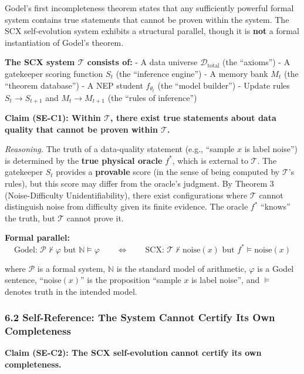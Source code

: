 \documentclass[
  12pt,
]{ctexart}
\begin{document}
Godel's first incompleteness theorem states that any sufficiently
powerful formal system contains true statements that cannot be proven
within the system. The SCX self-evolution system exhibits a structural
parallel, though it is \textbf{not} a formal instantiation of Godel's
theorem.

\textbf{The SCX system \(\mathcal{T}\) consists of:} - A data universe
\(\mathcal{D}_{\text{total}}\) (the ``axioms'') - A gatekeeper scoring
function \(S_t\) (the ``inference engine'') - A memory bank \(M_t\) (the
``theorem database'') - A NEP student \(f_{\theta_t}\) (the ``model
builder'') - Update rules \(S_t \to S_{t+1}\) and \(M_t \to M_{t+1}\)
(the ``rules of inference'')

\textbf{Claim (SE-C1): Within \(\mathcal{T}\), there exist true
statements about data quality that cannot be proven within
\(\mathcal{T}\).}

\emph{Reasoning.} The truth of a data-quality statement (e.g., ``sample
\(x\) is label noise'') is determined by the \textbf{true physical
oracle} \(f^*\), which is external to \(\mathcal{T}\). The gatekeeper
\(S_t\) provides a \textbf{provable} score (in the sense of being
computed by \(\mathcal{T}\)'s rules), but this score may differ from the
oracle's judgment. By Theorem 3 (Noise-Difficulty Unidentifiability),
there exist configurations where \(\mathcal{T}\) cannot distinguish
noise from difficulty given its finite evidence. The oracle \(f^*\)
``knows'' the truth, but \(\mathcal{T}\) cannot prove it.

\textbf{Formal parallel:}
\[\text{Godel: } \mathcal{P} \nvdash \varphi \text{ but } \mathbb{N} \models \varphi \qquad \Longleftrightarrow \qquad \text{SCX: } \mathcal{T} \nvdash \text{noise}(x) \text{ but } f^* \models \text{noise}(x)\]

where \(\mathcal{P}\) is a formal system, \(\mathbb{N}\) is the standard
model of arithmetic, \(\varphi\) is a Godel sentence, ``noise\((x)\)''
is the proposition ``sample \(x\) is label noise'', and \(\models\)
denotes truth in the intended model.

\subsubsection{6.2 Self-Reference: The System Cannot Certify Its Own
Completeness}\label{self-reference-the-system-cannot-certify-its-own-completeness}

\textbf{Claim (SE-C2): The SCX self-evolution cannot certify its own
completeness.}
\end{document}
